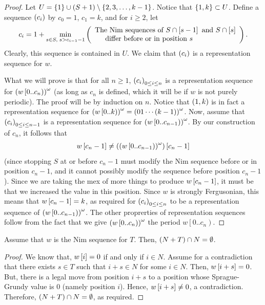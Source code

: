 \documentclass[english,12pt]{article}
\newcommand{\seq}{\p}
\begin{document}
\begin{proof}
Let $U=\left\{1\right\}\cup\left(S+1\right)\setminus\left\{2,3,\ldots,k-1\right\}$.  Notice that $\left\{1,k\right\}\subset U$.  Define a sequence $\seq{c_i}$ by $c_0=1$, $c_1=k$, and for $i\geq2$, let
\[
c_i=1+\min_{s\in S,\;s>c_{i-1}-1}\left(\begin{array}{l}\text{The Nim sequences of }S\cap\left[s-1\right]\text{ and }S\cap \left[s\right]\\\text{\hspace{0.2in}differ before or in position }s\end{array}\right).
\]
Clearly, this sequence is contained in $U$.  We claim that $\seq{c_i}$ is a representation sequence for $w$.

What we will prove is that for all $n\geq1$, $\seq{c_i}_{0\leq i\leq n}$ is a representation sequence for $\left(w\left[0..c_n\right)\right)^\omega$ (as long as $c_n$ is defined, which it will be if $w$ is not purely periodic).  The proof will be by induction on $n$.  Notice that $\left(1,k\right)$ is in fact a representation sequence for $\left(w\left[0..k\right)\right)^\omega=\left(01\cdots\left(k-1\right)\right)^\omega$.  Now, assume that $\left(c_i\right)_{0\leq i\leq n-1}$ is a representation sequence for $\left(w\left[0..c_{n-1}\right)\right)^\omega$.  By our construction of $c_n$, it follows that
\[
w\left[c_n-1\right]\neq\left(\left(w\left[0..c_{n-1}\right)\right)^\omega\right)\left[c_n-1\right]
\]
(since stopping $S$ at or before $c_n-1$ must modify the Nim sequence before or in position $c_n-1$, and it cannot possibly modify the sequence before position $c_n-1$).  Since we are taking the mex of more things to produce $w\left[c_n-1\right]$, it must be that we increased the value in this position.  Since $w$ is strongly Fergusonian, this means that $w\left[c_n-1\right]=k$, as required for $\seq{c_i}_{0\leq i\leq n}$ to be a representation sequence of $\left(w\left[0..c_{n-1}\right)\right)^\omega$.  The other proprerties of representation sequences follow from the fact that we give $\left(w\left[0..c_n\right)\right)^\omega$ the period $w\left[0..c_n\right)$.
\end{proof}
\begin{prop}\label{prop:convabsmain}
Assume that $w$ is the Nim sequence for $T$.  Then, $\left(N+T\right)\cap N=\emptyset$.
\end{prop}
\begin{proof}
We know that, $w\left[i\right]=0$ if and only if $i\in N$.  Assume for a contradiction that there exists $s\in T$ such that $i+s\in N$ for some $i\in N$.  Then, $w\left[i+s\right]=0$.  But, there is a legal move from position $i+s$ to a position whose Sprague-Grundy value is $0$ (namely position $i$).  Hence, $w\left[i+s\right]\neq0$, a contradiction.  Therefore, $\left(N+T\right)\cap N=\emptyset$, as required.
\end{proof}
\end{document}
